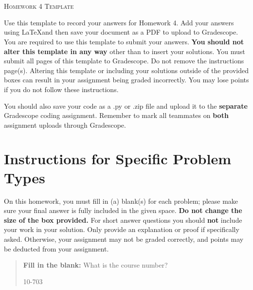 \documentclass[12pt]{article}
\begin{document}
\section*{}
\begin{center}
  \centerline{\textsc{\LARGE  Homework 4 Template}}
\end{center}

Use this template to record your answers for Homework 4.  Add your answers using \LaTeX and then save your document as a PDF to upload to Gradescope.  You are required to use this template to submit your answers.  \textbf{You should not alter this template in any way} other than to insert your solutions.  You must submit all \pageref{LastPage} pages of this template to Gradescope.  Do not remove the instructions page(s).  Altering this template or including your solutions outside of the provided boxes can result in your assignment being graded incorrectly.  You may lose points if you do not follow these instructions.

You should also save your code as a .py or .zip file and upload it to the \textbf{separate} Gradescope coding assignment. Remember to mark all teammates on \textbf{both} assignment uploads through Gradescope.

\section*{Instructions for Specific Problem Types}

On this homework, you must fill in (a) blank(s) for each problem; please make sure your final answer is fully included in the given space.  \textbf{Do not change the size of the box provided.}  For short answer questions you should \textbf{not} include your work in your solution.  Only provide an explanation or proof if specifically asked.  Otherwise, your assignment may not be graded correctly, and points may be deducted from your assignment.

\begin{quote}
\textbf{Fill in the blank:} What is the course number?

\begin{tcolorbox}[fit,height=1cm, width=4cm, blank, borderline={1pt}{-2pt},valign=center,nobeforeafter]
    \begin{center}\huge10-703\end{center}
    \end{tcolorbox}
\end{quote}

\newpage
\end{document}
